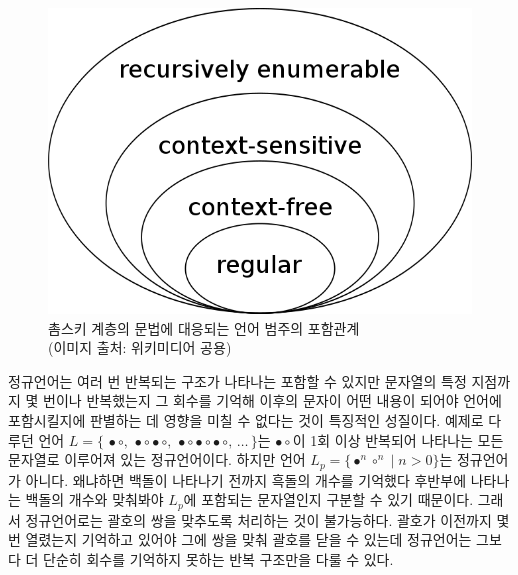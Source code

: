 \documentclass[b5paper,chapter,figtabcapt]{oblivoir}
\newcommand{\txtbullet}[0]{\ensuremath{\bullet}}
\newcommand{\txtcircle}[0]{\ensuremath{\circ}}
\begin{document}
\begin{figure}[b]\centering
\includegraphics[scale=0.5]{ChomskyHierarchy.png}
\caption{촘스키 계층의 문법에 대응되는 언어 범주의 포함관계
         \label{fig:ChomskyHierarchyLang}\\
         {\scriptsize(이미지 출처: 위키미디어 공용)} }
\end{figure}

정규언어는 여러 번 반복되는 구조가 나타나는 포함할 수 있지만
문자열의 특정 지점까지 몇 번이나 반복했는지 그 회수를 기억해
이후의 문자이 어떤 내용이 되어야 언어에 포함시킬지에 판별하는 데
영향을 미칠 수 없다는 것이 특징적인 성질이다. 예제로 다루던 언어
$L = \{\, \txtbullet\txtcircle
      ,\, \txtbullet\txtcircle\txtbullet\txtcircle
      ,\, \txtbullet\txtcircle\txtbullet\txtcircle\txtbullet\txtcircle
      ,\, \ldots
   \,\}$는 $\txtbullet\txtcircle$이 1회 이상 반복되어 나타나는
모든 문자열로 이루어져 있는 정규언어이다.
하지만 언어 $L_p = \{\txtbullet^n\txtcircle^n \mid n>0\}$는
정규언어가 아니다. 왜냐하면 백돌이 나타나기 전까지 흑돌의 개수를
기억했다 후반부에 나타나는 백돌의 개수와 맞춰봐야 $L_p$에 포함되는
문자열인지 구분할 수 있기 때문이다. 그래서 정규언어로는 괄호의 쌍을
맞추도록 처리하는 것이 불가능하다. 괄호가 이전까지 몇 번 열렸는지
기억하고 있어야 그에 쌍을 맞춰 괄호를 닫을 수 있는데 정규언어는
그보다 더 단순히 회수를 기억하지 못하는 반복 구조만을 다룰 수 있다.
\end{document}
